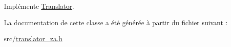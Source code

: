Implémente \hyperlink{class_translator_a31e719b4e290a359ddbb78132bf3f494}{Translator}.



La documentation de cette classe a été générée à partir du fichier suivant \+:\begin{DoxyCompactItemize}
\item 
src/\hyperlink{translator__za_8h}{translator\+\_\+za.\+h}\end{DoxyCompactItemize}

